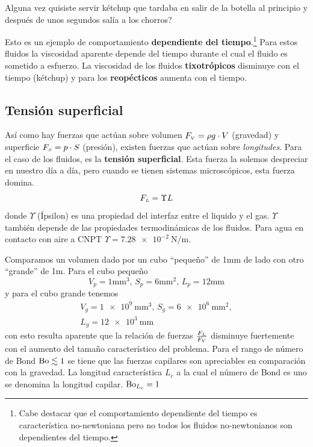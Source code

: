 \derpq Alguna vez quisiste servir kétchup que tardaba en salir de la botella al principio y después de unos segundos salía a los chorros? 

Esto es un ejemplo de comportamiento \textbf{dependiente del tiempo}.\footnote{Cabe destacar que el comportamiento dependiente del tiempo es característica no-newtoniana pero no todos los fluidos no-newtonianos son dependientes del tiempo.} Para estos fluidos la viscosidad aparente depende del tiempo durante el cual el fluido es sometido a esfuerzo. La viscosidad de los fluidos \textbf{tixotrópicos} disminuye con el tiempo (kétchup) y para los \textbf{reopécticos} aumenta con el tiempo.

\subsection{Tensión superficial}
Así como hay fuerzas que actúan sobre volumen $F_{\mbox{\tiny $V$}}=\rho g\cdot V$ (gravedad) y superficie $F_{\mbox{\tiny $S$}}=p\cdot S$ (presión), existen fuerzas que actúan sobre \textit{longitudes}. Para el caso de los fluidos, es la \textbf{tensión superficial}. Esta fuerza la solemos despreciar en nuestro día a día, pero cuando se tienen sistemas microscópicos, esta fuerza domina.
\[
F_{\mbox{\tiny $L$}} = \Upsilon L
\]%
donde $\Upsilon$ (Ípsilon) es una propiedad del interfaz entre el liquido y el gas. $\Upsilon$ también depende de las propiedades termodinámicas de los fluidos. Para agua en contacto con aire a CNPT $\Upsilon=\SI{7,28e-2}{\newton \per \meter}$.

Comparamos un volumen dado por un cubo ``pequeño'' de 1mm de lado con otro ``grande'' de 1m. Para el cubo pequeño
\vspace{-.2cm}
\[V_p=1\si{\milli \meter \cubed},\, S_p=6 \si{\milli \meter \squared},\, L_p = 12 \si{\milli \meter} \]
y para el cubo grande tenemos
\vspace{-.2cm}
\begin{gather*}
    V_g=\SI{1e9}{\milli \meter \cubed},\, S_g=\SI{6e6}{\milli \meter \squared},\\ L_g =\SI{12e3}{\milli \meter}
\end{gather*}
con esto resulta aparente que la relación de fuerzas $\frac{F_{\mbox{\tiny $L$}}}{F_{\mbox{\tiny $V$}}}$ disminuye fuertemente con el aumento del tamaño característico del problema. Para el rango de número de Bond $\textrm{Bo} \lesssim 1$ se tiene que las fuerzas capilares son apreciables en comparación con la gravedad. La longitud característica $L_c$ a la cual el número de Bond es uno se denomina la longitud capilar. $\textrm{Bo}_{L_c}=1$

